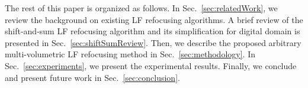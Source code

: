 %




The rest of this paper is organized as follows. In Sec.~\ref{sec:relatedWork}, we review the background on existing LF refocusing algorithms. A brief review of the shift-and-sum LF refocusing algorithm and its simplification for digital domain is presented in Sec.~\ref{sec:shiftSumReview}. Then, we describe the proposed arbitrary multi-volumetric LF refocusing method in Sec.~\ref{sec:methodology}. In Sec.~\ref{sec:experiments}, we present the experimental results. Finally, we conclude and present future work in Sec.~\ref{sec:conclusion}.

